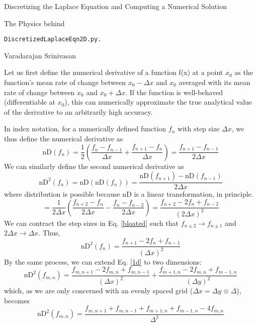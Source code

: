 \documentclass{article}
\begin{document}
\begin{flushleft}
{\large Discretizing the Laplace Equation and Computing a Numerical Solution}
\end{flushleft}
The Physics behind
\vspace{-2ex}
\begin{verbatim}
DiscretizedLaplaceEqn2D.py.
\end{verbatim}
\begin{flushright}
\smallskip
Varadarajan Srinivasan
\end{flushright}

\smallskip
Let us first define the numerical derivative of a function f(x) at a point $x_0$ as the function's mean rate of change between $x_0-\Delta x$ and $x_0$ averaged with its mean rate of change between $x_0$ and $x_0+\Delta x$. If the function is well-behaved (differentiable at $x_0$), this can numerically approximate the true analytical value of the derivative to an arbitrarily high accuracy.

In index notation, for a numerically defined function $f_n$ with step size $\Delta x$, we thus define the numerical derivative as
\begin{equation}
\mbox{nD}(f_n)=\frac{1}{2}\left(\frac{f_{n}-f_{n-1}}{\Delta x}+\frac{f_{n+1}-f_n}{\Delta x}\right)=\frac{f_{n+1}-f_{n-1}}{2\Delta x}
\end{equation}
We can similarly define the second numerical derivative as 
\begin{equation}
\mbox{nD}^2(f_n)=\mbox{nD}(\mbox{nD}(f_n))=\frac{\mbox{nD}(f_{n+1})-\mbox{nD}(f_{n-1})}{2\Delta x}
\end{equation}
where distribution is possible because nD is a linear transformation, in principle.
\begin{equation} \label{bloated}
=\frac{1}{2\Delta x}\left(\frac{f_{n+2}-f_{n}}{2\Delta x}-\frac{f_{n}-f_{n-2}}{2\Delta x}\right)=\frac{f_{n+2}-2f_{n}+f_{n-2}}{(2\Delta x)^2}
\end{equation}
We can contract the step sizes in Eq. \ref{bloated} such that $f_{n\pm 2}\rightarrow f_{n\pm 1}$ and $2\Delta x \rightarrow \Delta x$. Thus,
\begin{equation} \label{1d}
\mbox{nD}^2(f_n)=\frac{f_{n+1}-2f_{n}+f_{n-1}}{(\Delta x)^2}
\end{equation}
By the same process, we can extend Eq. \ref{1d} to two dimensions:
\begin{equation}
\mbox{nD}^2(f_{m,n})=\frac{f_{m,n+1}-2f_{m,n}+f_{m,n-1}}{(\Delta x)^2}+\frac{f_{m+1,n}-2f_{m,n}+f_{m-1,n}}{(\Delta y)^2}
\end{equation}
which, as we are only concerned with an evenly spaced grid ($\Delta x = \Delta y \equiv \Delta$), becomes
\begin{equation}
\mbox{nD}^2(f_{m,n})=\frac{f_{m,n+1}+f_{m,n-1}+f_{m+1,n}+f_{m-1,n}-4f_{m,n}}{\Delta^2}
\end{equation}
\end{document}
